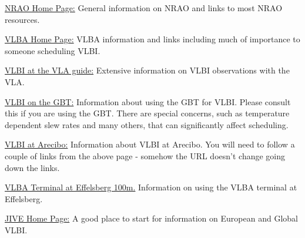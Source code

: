 \documentclass{report}
\begin{document}
\begin{list}{}{\parsep 0em  \itemsep 0em }

\item 
{\href{http://www.nrao.edu/}{NRAO Home Page:}}  General
information on NRAO and links to most NRAO resources.

\item 
{\href{http://www.vlba.nrao.edu/}{VLBA Home Page:}}
VLBA information and links
including much of importance to someone scheduling VLBI.

\item 
{\href{http://www.vla.nrao.edu/astro/guides/vlbivla/current/}{VLBI at the VLA guide:}}
Extensive information on VLBI observations with the VLA.


\item 
{\href{http://www.gb.nrao.edu/~fghigo/gbtdoc/vlbinfo.html\#hifreq}{VLBI on the GBT:}}
Information about using the GBT for VLBI.  Please consult this
if you are using the GBT.  There are special concerns, such as temperature
dependent slew rates and many others, that can significantly affect
scheduling.

\item 
{\href{http://www.naic.edu/science/generalinfo_set.htm}{VLBI at Arecibo:}}
Information about VLBI at Arecibo.  You will need to follow a couple
of links from the above page - somehow the URL doesn't change going
down the links.

\item 
{\href{http://www.mpifr-bonn.mpg.de/EVN/VLBAeff.html}{VLBA Terminal at Effelsberg 100m.}}
Information on using the VLBA terminal at Effelsberg.



\item 
{\href{http://www.jive.nl/}{JIVE Home Page:}}  A good
place to start for information on European and Global VLBI.

\end{list}
\end{document}
